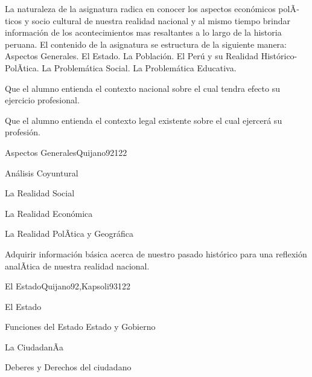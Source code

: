 \begin{syllabus}


\begin{justification}
La naturaleza de la asignatura radica en conocer los aspectos económicos polÃ­ticos y socio cultural de nuestra realidad nacional y al mismo tiempo brindar información de los acontecimientos mas resaltantes a lo largo de la historia peruana. El contenido de la asignatura se estructura de la siguiente manera: Aspectos Generales. El Estado. La Población. El Perú y su Realidad Histórico-PolÃ­tica. La Problemática Social. La Problemática Educativa.
\end{justification}

\begin{goals}
\item Que el alumno entienda el contexto nacional sobre el cual tendra efecto su ejercicio profesional.
\item Que el alumno entienda el contexto legal existente sobre el cual ejercerá su profesión.
\end{goals}

\begin{outcomes}
\end{outcomes}

\begin{unit}{Aspectos Generales}{Quijano92}{12}{2}
\begin{topics}
	\item Análisis Coyuntural
  	\item La Realidad Social
  	\item La Realidad Económica
  	\item La Realidad PolÃ­tica y Geográfica
\end{topics}

\begin{unitgoals}
      \item  Adquirir información básica acerca de nuestro pasado histórico para una reflexión analÃ­tica de nuestra realidad nacional.
   \end{unitgoals}
\end{unit}

\begin{unit}{El Estado}{Quijano92,Kapsoli93}{12}{2}
\begin{topics}
	\item El Estado
	\item Funciones del Estado Estado y Gobierno
	\item La CiudadanÃ­a
	\item Deberes y Derechos del ciudadano
\end{topics}


\end{unit}
\end{syllabus}
